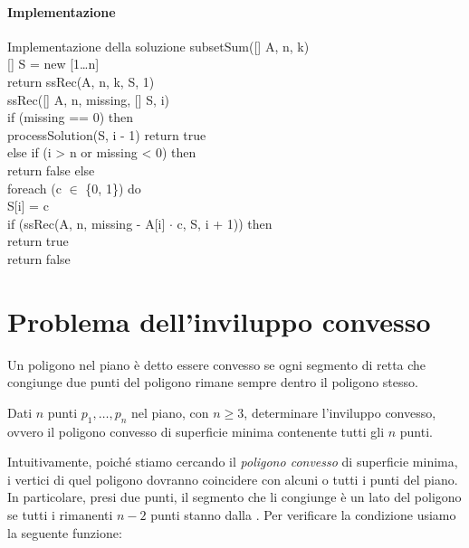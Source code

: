 \paragraph{Implementazione}
\begin{minicode}{Implementazione della soluzione}
\ind{} subsetSum([] A,  n,  k)\\
    [] S = new [1\dots n]\\
    return ssRec(A, n, k, S, 1)\\

\ind{} ssRec([] A,  n,  missing, [] S,  i)\\
    \indf if (missing == 0) then\\
        processSolution(S, i - 1)\hfill{}
        return true\\
    \indf else if (i > n or missing < 0) then\\
        return false\hfill{}
    \indf else\\
        \indff foreach (c $\in$ \{0, 1\}) do\\
            S[i] = c\\
            \indfff if (ssRec(A, n, missing - A[i] $\cdot$ c, S, i + 1)) then\\
                return true\\
        \indff return false
\end{minicode}

\section{Problema dell'inviluppo convesso}
\begin{definition}
    Un poligono nel piano è detto essere convesso se ogni segmento di retta
    che congiunge due punti del poligono rimane sempre dentro il poligono
    stesso.
\end{definition}
\begin{problem}
    Dati $n$ punti $p_1,\dots,p_n$ nel piano, con $n\geq 3$, determinare
    l'inviluppo convesso, ovvero il poligono convesso di superficie minima
    contenente tutti gli $n$ punti.
\end{problem}

\noindent
Intuitivamente, poiché stiamo cercando il \emph{poligono convesso} di superficie
minima, i vertici di quel poligono dovranno coincidere con alcuni o tutti i
punti del piano. In particolare, presi due punti, il segmento che li congiunge è
un lato del poligono se tutti i rimanenti $n-2$ punti stanno dalla . Per verificare la condizione usiamo la seguente funzione:

